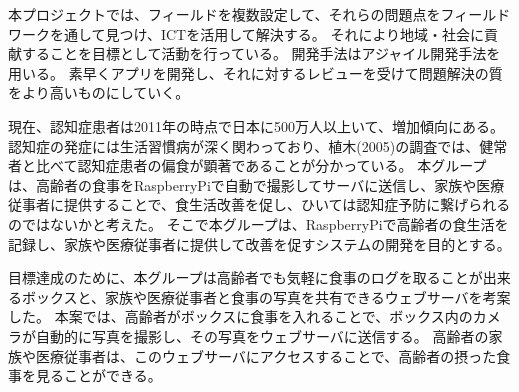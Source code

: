 \documentclass[../report]{subfiles}
\begin{document}
本プロジェクトでは、フィールドを複数設定して、それらの問題点をフィールドワークを通して見つけ、ICTを活用して解決する。
それにより地域・社会に貢献することを目標として活動を行っている。
開発手法はアジャイル開発手法を用いる。
素早くアプリを開発し、それに対するレビューを受けて問題解決の質をより高いものにしていく。

現在、認知症患者は2011年の時点で日本に500万人以上いて、増加傾向にある。
認知症の発症には生活習慣病が深く関わっており、植木(2005)の調査では、健常者と比べて認知症患者の偏食が顕著であることが分かっている。
本グループは、高齢者の食事をRaspberryPiで自動で撮影してサーバに送信し、家族や医療従事者に提供することで、食生活改善を促し、ひいては認知症予防に繋げられるのではないかと考えた。
そこで本グループは、RaspberryPiで高齢者の食生活を記録し、家族や医療従事者に提供して改善を促すシステムの開発を目的とする。

目標達成のために、本グループは高齢者でも気軽に食事のログを取ることが出来るボックスと、家族や医療従事者と食事の写真を共有できるウェブサーバを考案した。
本案では、高齢者がボックスに食事を入れることで、ボックス内のカメラが自動的に写真を撮影し、その写真をウェブサーバに送信する。
高齢者の家族や医療従事者は、このウェブサーバにアクセスすることで、高齢者の摂った食事を見ることができる。
\end{document}
